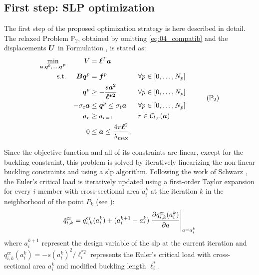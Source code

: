 \subsection{First step: SLP optimization}
The first step of the proposed optimization strategy is here described in detail. The relaxed Problem $\mathbb{P}_2$, obtained by omitting \eqref{eq:04_compatib} and the displacements $\bm{U}$ in Formulation , is stated as:
\begin{equation}
    \begin{aligned}
    \min_{\vect{a}, \vect{q}^0, \dots, \vect{q}^P}  && V &= \vect{\ell}^{T}\vect{a}\\
    \textrm{s.t.}   && \matr{B}\vect{q}^p &= \vect{f}^p && \forall p \in [0,\dots,N_p]\\
    && \vect{q}^p &\geq -\frac{s\vect{a}^2}{\vect{\ell^{*2}}} && \forall p \in [0,\dots,N_p] \\
    && -\sigma_\text{c}\vect{a} &\leq \vect{q}^p \leq \sigma_\text{t}\vect{a} && \forall p \in [0,\dots,N_p] \\
    && a_{r}&\geq a_{r=1} && r \in \mathcal{C}_{l,r}(\vect{a}) \\
    && 0 &\leq \vect{a} \leq \frac{4 \pi \vect{\ell}^2}{\lambda_{\text{max}}}. \\
    \end{aligned}
    \tag{$\mathbb{P}_2$}
    \label{eq:04_optim_no_constr}
\end{equation}

Since the objective function and all of its constraints are linear, except for the buckling constraint, this problem is solved by iteratively linearizing the non-linear buckling constraints and using a \gls{slp} algorithm. Following the work of Schwarz \etal {}, the Euler's critical load is iteratively updated using a first-order Taylor expansion for every $i$ member with cross-sectional area $a_{i}^k$ at the iteration $k$ in the neighborhood of the point $P_{k}$ (see ):
\begin{equation}
    \tilde{q}_{i,k}^{\text{cr}} = q_{i,k}^{\text{cr}}(a_{i}^k) + (a_{i}^{k+1} - a_{i}^k)\left.\frac{\partial q_{i,k}^{\text{cr}}(a_{i}^k)}{\partial a}\right\rvert_{a=a_{i}^k}
\end{equation}
where $a_{i}^{k+1}$ represent the design variable of the \gls{slp} at the current iteration and $q^{\text{cr}}_{i,k}(a_{i}^k) = -s ({a_{i}^k})^2/\ell^{*2}_i$ represents the Euler's critical load with cross-sectional area $a_{i}^k$ and modified buckling length $\ell^{*}_i$. 

